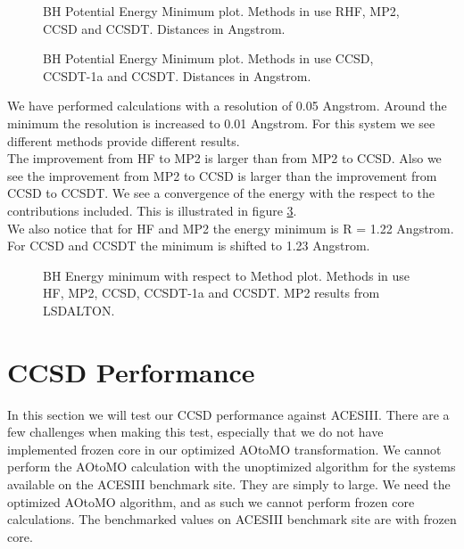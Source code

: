 \documentclass[a4paper,norsk,11pt,twoside]{report}
\begin{document}
\begin{figure}[h!]
\begin{center}
\caption{BH Potential Energy Minimum plot. Methods in use RHF, MP2, CCSD and CCSDT. Distances in Angstrom.}
\label{fig:zom1}
\end{center}
\end{figure}

\begin{figure}[h!]
\begin{center}
\caption{BH Potential Energy Minimum plot. Methods in use CCSD, CCSDT-1a and CCSDT. Distances in Angstrom.}
\label{fig:zom2}
\end{center}
\end{figure}






We have performed calculations with a resolution of 0.05 Angstrom. Around the minimum the resolution is increased to 0.01 Angstrom.  For this system we see different methods provide different results. \\

The improvement from HF to MP2 is larger than from MP2 to CCSD. Also we see the improvement from MP2 to CCSD is larger than the improvement from CCSD to CCSDT. We see a convergence of the energy with the respect to the contributions included. This is illustrated in figure \ref{fig:zom3}. \\

We also notice that for HF and MP2 the energy minimum is R = 1.22 Angstrom. For CCSD and CCSDT the minimum is shifted to 1.23 Angstrom. 

\newpage

\begin{figure}[h!]
\begin{center}
\caption{BH Energy minimum with respect to Method plot. Methods in use HF, MP2, CCSD, CCSDT-1a and CCSDT. MP2 results from LSDALTON. }
\label{fig:zom3}
\end{center}
\end{figure}

\section{CCSD Performance}
In this section we will test our CCSD performance against ACESIII. There are a few challenges when making this test, especially that we do not have implemented frozen core in our optimized AOtoMO transformation. We cannot perform the AOtoMO calculation with the unoptimized algorithm for the systems available on the ACESIII benchmark site. They are simply to large. We need the optimized AOtoMO algorithm, and as such we cannot perform frozen core calculations. The benchmarked values on ACESIII benchmark site are with frozen core. \\
\end{document}
